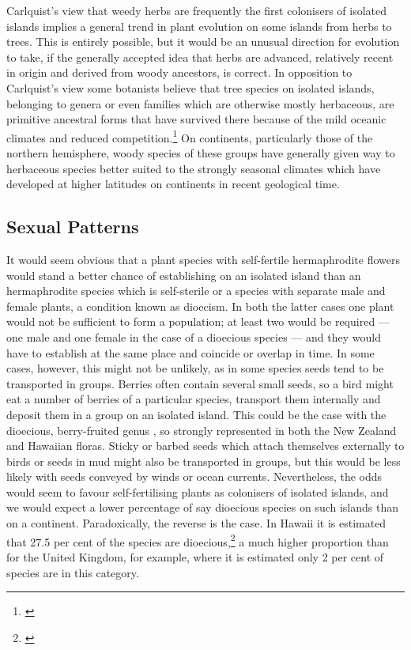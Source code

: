 Carlquist's view that weedy herbs are frequently the first colonisers of isolated islands implies a general trend in plant evolution on some islands from herbs to trees.
This is entirely possible, but it would be an unusual direction for evolution to take, if the generally accepted idea that herbs are advanced, relatively recent in origin and derived from woody ancestors, is correct.
In opposition to Carlquist's view some botanists believe that tree species on isolated islands, belonging to genera or even families which are otherwise mostly herbaceous, are primitive ancestral forms that have survived there because of the mild oceanic climates and reduced competition.\footnote{\cite{mabberley1979pachycaul}}
On continents, particularly those of the northern hemisphere, woody species of these groups have generally given way to herbaceous species better suited to the strongly seasonal climates which have developed at higher latitudes on continents in recent geological time.

\subsection{Sexual Patterns}

It would seem obvious that a plant species with self-fertile hermaphrodite flowers would stand a better chance of establishing on an isolated island than an hermaphrodite species which is self-sterile or a species with separate male and female plants, a condition known as dioecism.
In both the latter cases one plant would not be sufficient to form a population; at least two would be required --- one male and one female in the case of a dioecious species --- and they would have to establish at the same place and coincide or overlap in time.
In some cases, however, this might not be unlikely, as in some species seeds tend to be transported in groups.
Berries often contain several small seeds, so a bird might eat a number of berries of a particular species, transport them internally and deposit them in a group on an isolated island.
This could be the case with the dioecious, berry-fruited genus , so strongly represented in both the New Zealand and Hawaiian floras.
Sticky or barbed seeds which attach themselves externally to birds or seeds in mud might also be transported in groups, but this would be less likely with seeds conveyed by winds or ocean currents.
Nevertheless, the odds would seem to favour self-fertilising plants as colonisers of isolated islands, and we would expect a lower percentage of say dioecious species on such islands than on a continent.
Paradoxically, the reverse is the case.
In Hawai{\okina}i it is estimated that 27.5 per cent of the species are dioecious,\footnote{\cite{carlquist1970hawaii}} a much higher proportion than for the United Kingdom, for example, where it is estimated only 2 per cent of species are in this category.

